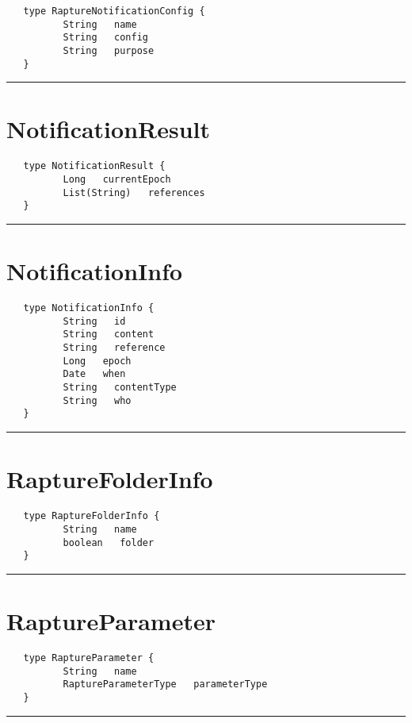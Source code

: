 \begin{verbatim}
   type RaptureNotificationConfig {
          String   name
          String   config
          String   purpose
   }
\end{verbatim}

\rule{12cm}{2pt}
\section{NotificationResult}
\label{type:NotificationResult}

\begin{verbatim}
   type NotificationResult {
          Long   currentEpoch
          List(String)   references
   }
\end{verbatim}

\rule{12cm}{2pt}
\section{NotificationInfo}
\label{type:NotificationInfo}

\begin{verbatim}
   type NotificationInfo {
          String   id
          String   content
          String   reference
          Long   epoch
          Date   when
          String   contentType
          String   who
   }
\end{verbatim}

\rule{12cm}{2pt}
\section{RaptureFolderInfo}
\label{type:RaptureFolderInfo}

\begin{verbatim}
   type RaptureFolderInfo {
          String   name
          boolean   folder
   }
\end{verbatim}

\rule{12cm}{2pt}
\section{RaptureParameter}
\label{type:RaptureParameter}

\begin{verbatim}
   type RaptureParameter {
          String   name
          RaptureParameterType   parameterType
   }
\end{verbatim}

\rule{12cm}{2pt}
